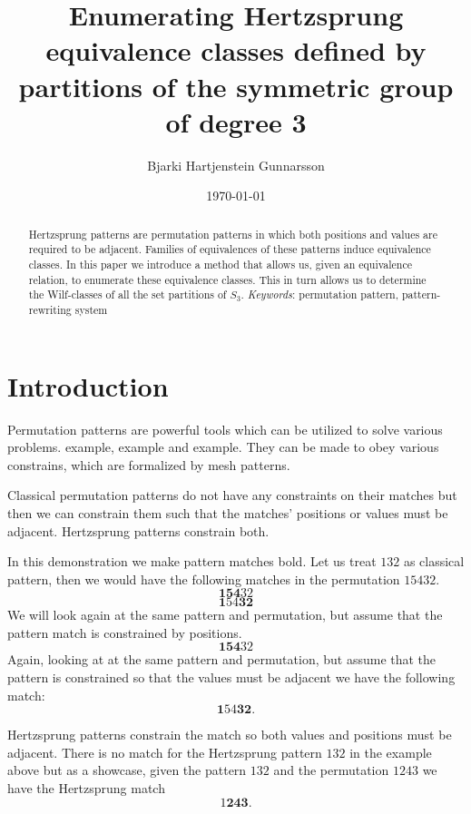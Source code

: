\documentclass[openany, a4paper, 11pt, english]{article}
\newcommand{\breath}{\vspace{6pt plus 2pt minus 1pt}\noindent}
\theoremstyle{definition}
\newcommand{\Sym}{S}
\begin{document}
\title{Enumerating Hertzsprung equivalence classes defined by partitions of the symmetric group of degree 3}
\author{Bjarki Hartjenstein Gunnarsson}
\date{\today}
\maketitle

\begin{abstract}
    Hertzsprung patterns are permutation patterns in which both positions and
    values are required to be adjacent. Families of equivalences of these
    patterns induce equivalence classes. In this paper we introduce a method
    that allows us, given an equivalence relation, to enumerate these
    equivalence classes. This in turn allows us to determine the Wilf-classes of
    all the set partitions of $\Sym_3$.
    \breath \emph{Keywords}: permutation pattern, pattern-rewriting system
\end{abstract}

\section{Introduction}
Permutation patterns are powerful tools which can be utilized to solve various
problems. example, example and example. They can be made to obey various
constrains, which are formalized by mesh patterns. \cite{claesson:2011}

Classical permutation patterns do not have any constraints on their matches but then we can
constrain them such that the matches' positions or values must be adjacent.
Hertzsprung patterns constrain both. 

In this demonstration we make pattern matches bold.  Let us treat $132$ as classical
pattern, then we would have the following matches in the permutation $15432$.
\[
    \bm{154}32
\]
\[
    \bm{1}54\bm{32}
\]
We will look again at the same pattern and permutation, but assume that the
pattern match is constrained by positions.
\[
    \bm{154}32
\]
Again, looking at at the same pattern and permutation, but assume that the
pattern is constrained so that the values must be adjacent we have the following
match:
\[
    \bm{1}54\bm{32}.
\]

Hertzsprung patterns constrain the match so both values and positions must be
adjacent. There is no match for the Hertzsprung pattern $132$ in the example
above but as a showcase, given the pattern $132$ and the permutation $1243$ we
have the Hertzsprung match
\[
    1\bm{243}.
\]
\end{document}
